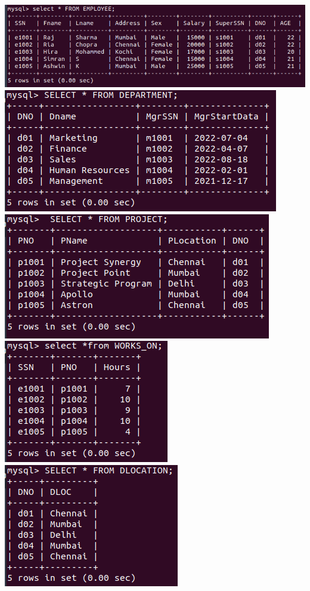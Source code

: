 \documentclass[a4paper,12pt]{report}
\begin{document}
\includegraphics[scale=0.5]{EMPLOYEE2.png}\newline\newline
\includegraphics[scale=0.8]{DEPARTMENT2.png}\newline\newline
\includegraphics[scale=0.7]{PROJECT2.png}\newline\newline
\includegraphics[scale=0.8]{WORKS_ON2.png}\newline\newline
\includegraphics[scale=0.8]{DLOCATION2.png}\\
\end{document}
